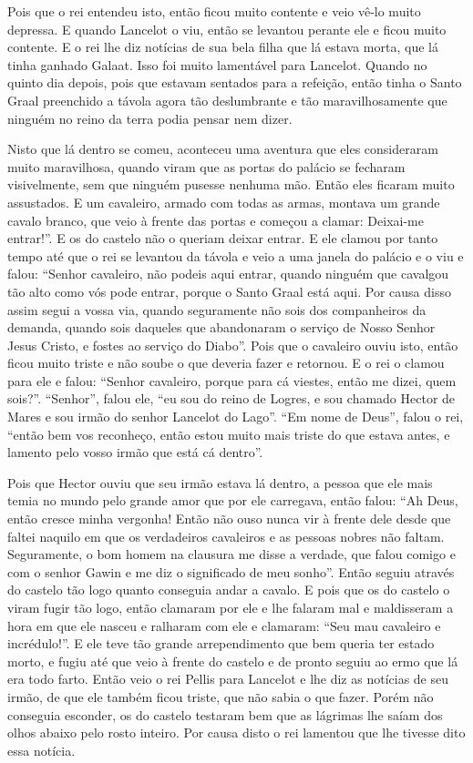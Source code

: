 Pois que o rei entendeu isto, então ficou muito contente e veio vê-lo muito
depressa. E quando Lancelot o viu, então se levantou perante ele e ficou muito
contente. E o rei lhe diz notícias de sua bela filha que lá estava morta, que
lá tinha ganhado Galaat. Isso foi muito lamentável para Lancelot. Quando no
quinto dia depois, pois que estavam sentados para a refeição, então tinha o
Santo Graal preenchido a távola agora tão deslumbrante e tão maravilhosamente
que ninguém no reino da terra podia pensar nem dizer. 

Nisto que lá dentro se comeu, aconteceu uma aventura que eles consideraram muito
maravilhosa, quando viram que as portas do palácio se fecharam visivelmente,
sem que ninguém pusesse nenhuma mão. Então eles ficaram muito assustados. E um
cavaleiro, armado com todas as armas, montava um grande cavalo branco, que veio
à frente das portas e começou a clamar: Deixai-me entrar!”. E os do castelo não
o queriam deixar entrar. E ele clamou por tanto tempo até que o rei se levantou
da távola e veio a uma janela do palácio e o viu e falou: “Senhor cavaleiro,
não podeis aqui entrar, quando ninguém que cavalgou tão alto como vós pode
entrar, porque o Santo Graal está aqui. Por causa disso assim segui a vossa
via, quando seguramente não sois dos companheiros da demanda, quando sois
daqueles que abandonaram o serviço de Nosso Senhor Jesus Cristo, e fostes ao
serviço do Diabo”. Pois que o cavaleiro ouviu isto, então ficou muito triste e
não soube o que deveria fazer e retornou. E o rei o clamou para ele e falou:
“Senhor cavaleiro, porque para cá viestes, então me dizei, quem sois?”.
“Senhor”, falou ele, “eu sou do reino de Logres, e sou chamado Hector de Mares
e sou irmão do senhor Lancelot do Lago”. “Em nome de Deus”, falou o rei,
“então bem vos reconheço, então estou muito mais triste do que estava antes, e
lamento pelo vosso irmão que está cá dentro”. 

Pois que Hector ouviu que seu irmão estava lá dentro, a pessoa que ele mais
temia no mundo pelo grande amor que por ele carregava, então falou: “Ah Deus,
então cresce minha vergonha! Então não ouso nunca vir à frente dele desde que
faltei naquilo em que os verdadeiros cavaleiros e as pessoas nobres não faltam.
Seguramente, o bom homem na clausura me disse a verdade, que falou comigo e com
o senhor Gawin e me diz o significado de meu sonho”. Então seguiu através do
castelo tão logo quanto conseguia andar a cavalo. E pois que os do castelo o
viram fugir tão logo, então clamaram por ele e lhe falaram mal e maldisseram a
hora em que ele nasceu e ralharam com ele e clamaram: “Seu mau cavaleiro e
incrédulo!”.  E ele teve tão grande arrependimento que bem queria ter estado
morto, e fugiu até que veio à frente do castelo e de pronto seguiu ao ermo que
lá era todo farto. Então veio o rei Pellis para Lancelot e lhe diz as notícias
de seu irmão, de que ele também ficou triste, que não sabia o que fazer. Porém
não conseguia esconder, os do castelo testaram bem que as lágrimas lhe saíam
dos olhos abaixo pelo rosto inteiro. Por causa disto o rei lamentou que lhe
tivesse dito essa notícia.

